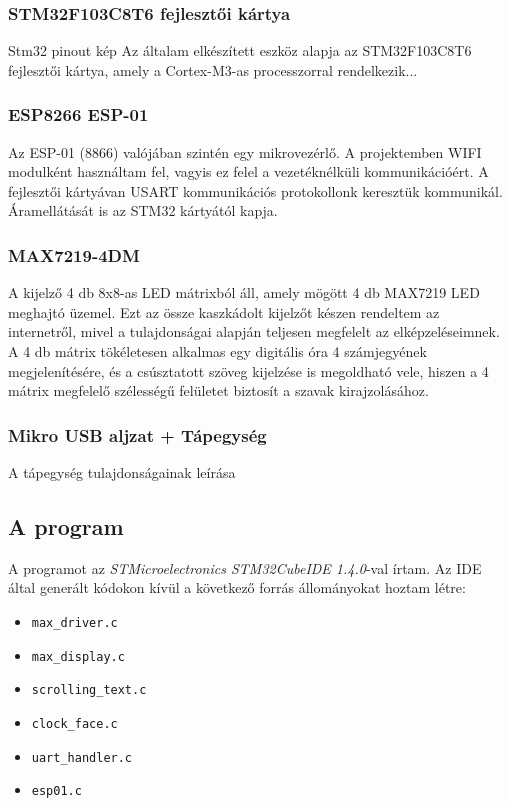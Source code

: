 \documentclass[a4paper, 12pt]{article}
\begin{document}
\subsubsection{STM32F103C8T6 fejlesztői kártya}
Stm32 pinout kép
Az általam elkészített eszköz alapja az STM32F103C8T6 fejlesztői kártya, amely a Cortex-M3-as processzorral rendelkezik...

\subsubsection{ESP8266 ESP-01}
Az ESP-01 (8866) valójában szintén egy mikrovezérlő. A projektemben WIFI modulként használtam fel, vagyis ez felel a vezetéknélküli kommunikációért. A fejlesztői kártyávan USART kommunikációs protokollonk keresztük kommunikál. Áramellátását is az STM32 kártyától kapja. 

\subsubsection{MAX7219-4DM}
A kijelző 4 db 8x8-as LED mátrixból áll, amely mögött 4 db MAX7219 LED meghajtó üzemel. Ezt az össze kaszkádolt kijelzőt készen rendeltem az internetről, mivel a tulajdonságai alapján teljesen megfelelt az elképzeléseimnek. A 4 db mátrix tökéletesen alkalmas egy digitális óra 4 számjegyének megjelenítésére, és a csúsztatott szöveg kijelzése is megoldható vele, hiszen a 4 mátrix megfelelő szélességű felületet biztosít a szavak kirajzolásához.

\subsubsection{Mikro USB aljzat + Tápegység}
A tápegység tulajdonságainak leírása

\subsection{A program}

A programot az \textit{STMicroelectronics STM32CubeIDE 1.4.0}-val írtam.
Az IDE által generált kódokon kívül a következő forrás állományokat hoztam létre:
\begin{itemize}[noitemsep]
	\item \texttt{max\_driver.c}
	\item \texttt{max\_display.c}
	\item \texttt{scrolling\_text.c}
	\item \texttt{clock\_face.c}
	\item \texttt{uart\_handler.c}
	\item \texttt{esp01.c}
\end{itemize}
\end{document}

